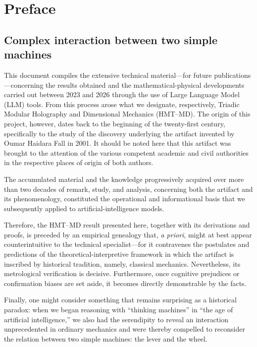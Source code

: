 \chapter*{Preface}

\section*{Complex interaction between two simple machines}
{}

This document compiles the extensive technical material---for future publications---concerning the results obtained and the mathematical-physical developments carried out between 2023 and 2026 through the use of Large Language Model (LLM) tools. From this process arose what we designate, respectively, Triadic Modular Holography and Dimensional Mechanics (HMT–MD). The origin of this project, however, dates back to the beginning of the twenty-first century, specifically to the study of the discovery underlying the artifact invented by Oumar Haidara Fall in 2001. It should be noted here that this artifact was brought to the attention of the various competent academic and civil authorities in the respective places of origin of both authors.

The accumulated material and the knowledge progressively acquired over more than two decades of remark, study, and analysis, concerning both the artifact and its phenomenology, constituted the operational and informational basis that we subsequently applied to artificial-intelligence models.

Therefore, the HMT–MD result presented here, together with its derivations and proofs, is preceded by an empirical genealogy that, \textit{a priori}, might at best appear counterintuitive to the technical specialist—for it contravenes the postulates and predictions of the theoretical-interpretive framework in which the artifact is inscribed by historical tradition, namely, classical mechanics. Nevertheless, its metrological verification is decisive. Furthermore, once cognitive prejudices or confirmation biases are set aside, it becomes directly demonstrable by the facts.

Finally, one might consider something that remains surprising as a historical paradox: when we began reasoning with “thinking machines” in “the age of artificial intelligence,” we also had the serendipity to reveal an interaction unprecedented in ordinary mechanics and were thereby compelled to reconsider the relation between two simple machines: the lever and the wheel.
